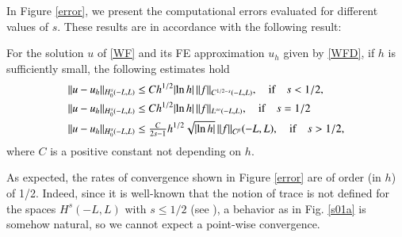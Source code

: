 In Figure \ref{error}, we present the computational errors evaluated for different values of $s$. These results are in accordance with the following result: 
%
\begin{theorem}
%
For the solution $u$ of \eqref{WF} and its FE approximation $u_h$ given by \eqref{WFD}, if $h$ is sufficiently small, the following estimates hold
%
\begin{align*}
&\|u-u_h\|_{H^s_0(-L,L)}\leq C h^{1/2}|\!\ln h|\,\|f\|_{C^{1/2-s}(-L,L)}, \quad \textnormal{if}\quad s<1/2, \\
&\|u-u_h\|_{H^s_0(-L,L)}\leq C h^{1/2} |\!\ln h|\, \|f\|_{L^\infty(-L,L)}, \quad \textnormal{if}\quad  s=1/2 \\
&\|u-u_h\|_{H^s_0(-L,L)}\leq \tfrac{C}{2s-1} h^{1/2} \sqrt{|\!\ln h|}\, \|f\|_{C^\beta}(-L,L), \quad \textnormal{if} \quad s>1/2,
\end{align*}
%
where $C$ is a positive constant not depending on $h$. 
%
\end{theorem}

As expected, the rates of convergence shown in Figure \ref{error} are of order (in $h$) of 1/2. Indeed, since it is well-known that the notion of trace is not defined for the spaces $H^s(-L,L)$ with $s\leq 1/2$ (see \cite{lions1968problemes,tartar2007introduction}), a behavior as in Fig. \ref{s01a} is somehow natural, so we cannot expect a point-wise convergence. 

